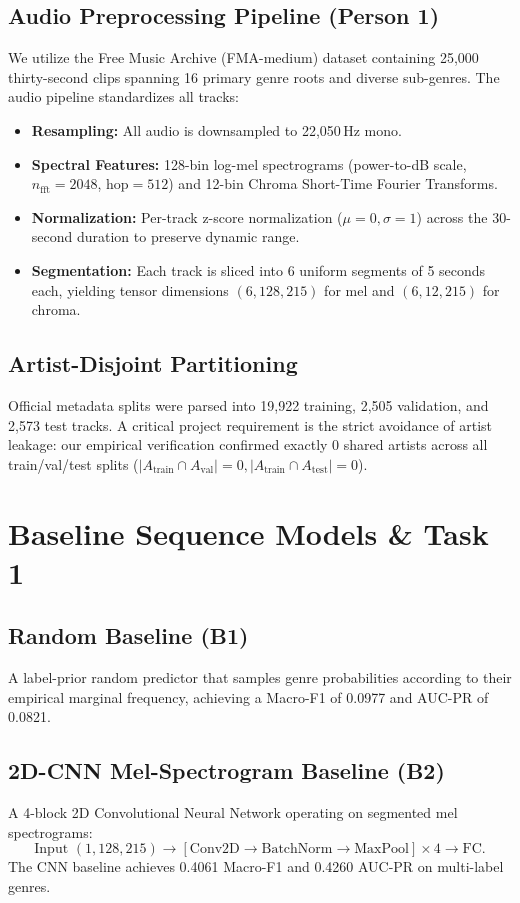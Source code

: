 \documentclass[conference]{IEEEtran}
\begin{document}
\subsection{Audio Preprocessing Pipeline (Person 1)}
We utilize the Free Music Archive (FMA-medium) dataset containing 25,000 thirty-second clips spanning 16 primary genre roots and diverse sub-genres. The audio pipeline standardizes all tracks:
\begin{itemize}
    \item \textbf{Resampling:} All audio is downsampled to 22,050\,Hz mono.
    \item \textbf{Spectral Features:} 128-bin log-mel spectrograms (power-to-dB scale, $n_{\text{fft}}=2048$, $\text{hop}=512$) and 12-bin Chroma Short-Time Fourier Transforms.
    \item \textbf{Normalization:} Per-track z-score normalization ($\mu=0, \sigma=1$) across the 30-second duration to preserve dynamic range.
    \item \textbf{Segmentation:} Each track is sliced into 6 uniform segments of 5 seconds each, yielding tensor dimensions $(6, 128, 215)$ for mel and $(6, 12, 215)$ for chroma.
\end{itemize}

\subsection{Artist-Disjoint Partitioning}
Official metadata splits were parsed into 19,922 training, 2,505 validation, and 2,573 test tracks. A critical project requirement is the strict avoidance of artist leakage: our empirical verification confirmed exactly 0 shared artists across all train/val/test splits ($|A_{\text{train}} \cap A_{\text{val}}| = 0, |A_{\text{train}} \cap A_{\text{test}}| = 0$).

\section{Baseline Sequence Models \& Task 1}
\subsection{Random Baseline (B1)}
A label-prior random predictor that samples genre probabilities according to their empirical marginal frequency, achieving a Macro-F1 of 0.0977 and AUC-PR of 0.0821.

\subsection{2D-CNN Mel-Spectrogram Baseline (B2)}
A 4-block 2D Convolutional Neural Network operating on segmented mel spectrograms:
$$\text{Input } (1, 128, 215) \to [\text{Conv2D} \to \text{BatchNorm} \to \text{MaxPool}] \times 4 \to \text{FC}.$$
The CNN baseline achieves 0.4061 Macro-F1 and 0.4260 AUC-PR on multi-label genres.
\end{document}
